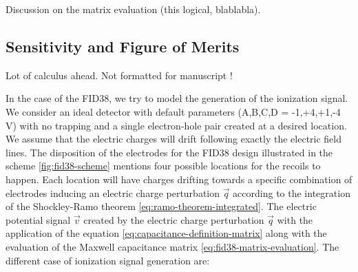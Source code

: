 { \color{blue} 
Discussion on the matrix evaluation (this logical, blablabla).
}

\subsection{Sensitivity and Figure of Merits}

{\color{red} Lot of calculus ahead. Not formatted for manuscript !}

In the case of the FID38, we try to model the generation of the ionization signal. We consider an ideal detector with default parameters (A,B,C,D = -1,+4,+1,-4 V) with no trapping and a single electron-hole pair created at a desired location. We assume that the electric charges will drift following exactly the electric field lines. The disposition of the electrodes for the FID38 design illustrated in the scheme \ref{fig:fid38-scheme} mentions four possible locations for the recoils to happen. Each location will have charges drifting towards a specific combination of electrodes inducing an electric charge perturbation $\vec{q}$ according to the integration of the Shockley-Ramo theorem \ref{eq:ramo-theorem-integrated}. The electric potential signal $\vec{v}$ created by the electric charge perturbation $\vec{q}$ with the application of the equation \ref{eq:capacitance-definition-matrix} along with the evaluation of the Maxwell capacitance matrix \ref{eq:fid38-matrix-evaluation}. The different case of ionization signal generation are:
